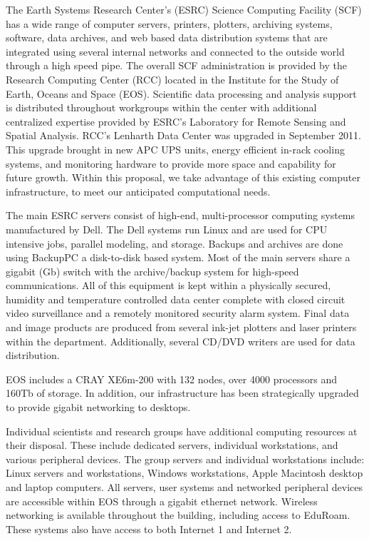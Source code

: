 \documentclass[
  letterpaper,
  DIV=11,
  numbers=noendperiod]{scrreprt}
\begin{document}
The Earth Systems Research Center's (ESRC) Science Computing Facility
(SCF) has a wide range of computer servers, printers, plotters,
archiving systems, software, data archives, and web based data
distribution systems that are integrated using several internal networks
and connected to the outside world through a high speed pipe. The
overall SCF administration is provided by the Research Computing Center
(RCC) located in the Institute for the Study of Earth, Oceans and Space
(EOS). Scientific data processing and analysis support is distributed
throughout workgroups within the center with additional centralized
expertise provided by ESRC's Laboratory for Remote Sensing and Spatial
Analysis. RCC's Lenharth Data Center was upgraded in September 2011.
This upgrade brought in new APC UPS units, energy efficient in-rack
cooling systems, and monitoring hardware to provide more space and
capability for future growth. Within this proposal, we take advantage of
this existing computer infrastructure, to meet our anticipated
computational needs.

The main ESRC servers consist of high-end, multi-processor computing
systems manufactured by Dell. The Dell systems run Linux and are used
for CPU intensive jobs, parallel modeling, and storage. Backups and
archives are done using BackupPC a disk-to-disk based system. Most of
the main servers share a gigabit (Gb) switch with the archive/backup
system for high-speed communications. All of this equipment is kept
within a physically secured, humidity and temperature controlled data
center complete with closed circuit video surveillance and a remotely
monitored security alarm system. Final data and image products are
produced from several ink-jet plotters and laser printers within the
department. Additionally, several CD/DVD writers are used for data
distribution.

EOS includes a CRAY XE6m-200 with 132 nodes, over 4000 processors and
160Tb of storage. In addition, our infrastructure has been strategically
upgraded to provide gigabit networking to desktops.

Individual scientists and research groups have additional computing
resources at their disposal. These include dedicated servers, individual
workstations, and various peripheral devices. The group servers and
individual workstations include: Linux servers and workstations, Windows
workstations, Apple Macintosh desktop and laptop computers. All servers,
user systems and networked peripheral devices are accessible within EOS
through a gigabit ethernet network. Wireless networking is available
throughout the building, including access to EduRoam. These systems also
have access to both Internet 1 and Internet 2.
\end{document}
